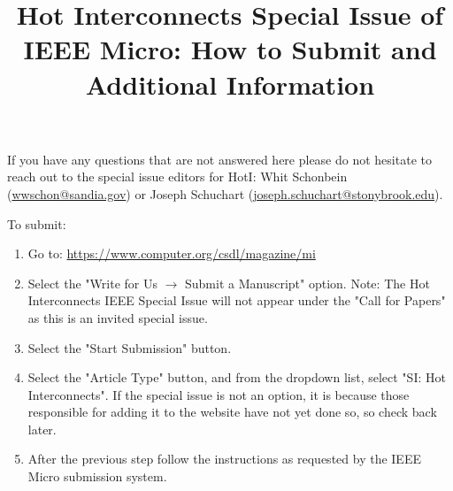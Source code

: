 \documentclass{article}
\begin{document}
\title{Hot Interconnects Special Issue of IEEE Micro: How to Submit and Additional Information}
\maketitle

\noindent If you have any questions that are not answered here please do not hesitate to reach out 
to the special issue editors for HotI: Whit Schonbein (\href{mailto:wwschon@sandia.gov}{wwschon@sandia.gov}) or 
Joseph Schuchart (\href{mailto:joseph.schuchart@stonybrook.edu}{joseph.schuchart@stonybrook.edu}).

\bigskip

\noindent To submit:
\begin{enumerate}
\item Go to: \url{https://www.computer.org/csdl/magazine/mi}
\item Select the "Write for Us $\rightarrow$ Submit a Manuscript" option. Note: 
The Hot Interconnects IEEE Special Issue will not appear under the "Call for Papers" as this is an invited 
special issue. 
\item Select the "Start Submission" button.
\item Select the "Article Type" button, and from the dropdown list, select "SI: Hot Interconnects". 
If the special issue is not an option, it is because those responsible for adding it to the website have not yet done so, 
so check back later.
\item After the previous step follow the instructions as requested by the IEEE Micro submission system.
\end{enumerate}

\bigskip
\end{document}
